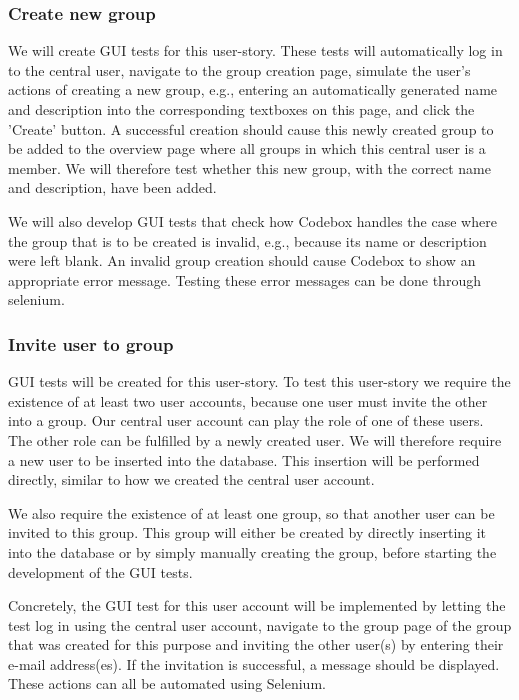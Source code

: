 \documentclass[10pt,a4paper,BCOR12mm, headexclude, footexclude,
  twoside, openright]{scrartcl}
\numberwithin{equation}{section} %
\numberwithin{figure}{section} %
\numberwithin{table}{section} %
\begin{document}
\subsubsection*{Create new group}

We will create GUI tests for this user-story. These tests will automatically log in to the central user, navigate to the group creation page, simulate the user's actions of creating a new group, e.g., entering an automatically generated name and description into the corresponding textboxes on this page, and click the 'Create' button.
A successful creation should cause this newly created group to be added to the overview page where all groups in which this central user is a member.
We will therefore test whether this new group, with the correct name and description, have been added.

We will also develop GUI tests that check how Codebox handles the case where the group that is to be created is invalid, e.g., because its name or description were left blank.
An invalid group creation should cause Codebox to show an appropriate error message. Testing these error messages can be done through selenium.

\subsubsection*{Invite user to group}

GUI tests will be created for this user-story.
To test this user-story we require the existence of at least two user accounts, because one user must invite the other into a group.
Our central user account can play the role of one of these users. The other role can be fulfilled by a newly created user.
We will therefore require a new user to be inserted into the database. This insertion will be performed directly, similar to how we created the central user account.

We also require the existence of at least one group, so that another user can be invited to this group. This group will either be created by directly inserting it into the database or by simply manually creating the group, before starting the development of the GUI tests.

Concretely, the GUI test for this user account will be implemented by letting the test log in using the central user account, navigate to the group page of the group that was created for this purpose and inviting the other user(s) by entering their e-mail address(es).
If the invitation is successful, a message should be displayed.
These actions can all be automated using Selenium.
\end{document}
